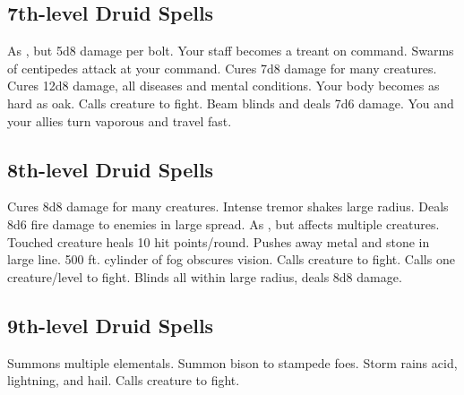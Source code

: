 \subsection{7th-level Druid Spells}
\begin{spelllist}
 As , but 5d8 damage per bolt.
 Your staff becomes a treant on command.
 Swarms of centipedes attack at your command.
 Cures 7d8 damage for many creatures.
 Cures 12d8 damage, all diseases and mental conditions.
 Your body becomes as hard as oak. 
 Calls creature to fight.
 Beam blinds and deals 7d6 damage.
 You and your allies turn vaporous and travel fast.
\end{spelllist}

\subsection{8th-level Druid Spells}
\begin{spelllist}
 Cures 8d8 damage for many creatures.
 Intense tremor shakes large radius.
 Deals 8d6 fire damage to enemies in large spread.
 As , but affects multiple creatures.
 Touched creature heals 10 hit points/round.
 Pushes away metal and stone in large line.
 500 ft. cylinder of fog obscures vision.
 Calls creature to fight.
 Calls one creature/level to fight.
 Blinds all within large radius, deals 8d8 damage.
\end{spelllist}

\subsection{9th-level Druid Spells}
\begin{spelllist}
 Summons multiple elementals.
 Summon bison to stampede foes.
 Storm rains acid, lightning, and hail.
 Calls creature to fight.
\end{spelllist}

